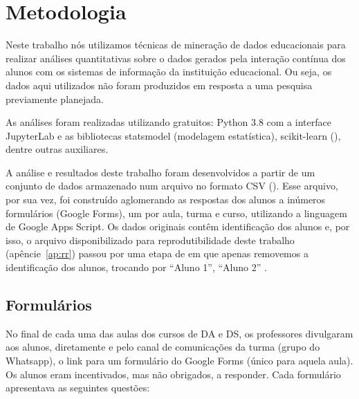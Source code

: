 \section{Metodologia}

Neste trabalho nós utilizamos técnicas de mineração de dados educacionais \cite{Baker2011} para realizar análises quantitativas sobre o dados gerados pela interação contínua dos alunos com os sistemas de informação da instituição educacional.
Ou seja, os dados aqui utilizados não foram produzidos em resposta a uma pesquisa previamente planejada.

As análises foram realizadas utilizando  gratuitos: Python 3.8 com a interface JupyterLab e as bibliotecas statsmodel (modelagem estatística), scikit-learn (), dentre outras auxiliares.

A análise e resultados deste trabalho foram desenvolvidos a partir de um conjunto de dados armazenado num arquivo no formato CSV ().
Esse arquivo, por sua vez, foi construído aglomerando as respostas dos alunos a inúmeros formulários (Google Forms), um por aula, turma e curso, utilizando a linguagem de  Google Apps Script.
Os dados originais contêm identificação dos alunos e, por isso, o arquivo disponibilizado para reprodutibilidade deste trabalho (apêncie~\ref{ap:rr}) passou por uma etapa de em que apenas removemos a identificação dos alunos, trocando por ``Aluno 1'', ``Aluno 2'' \etc.

\subsection{Formulários}

No final de cada uma das aulas dos cursos de DA e DS, os professores divulgaram aos alunos, diretamente e pelo canal de comunicações da turma (grupo do Whatsapp), o link para um formulário do Google Forms (único para aquela aula).
Os alunos eram incentivados, mas não obrigados, a responder.
Cada formulário apresentava as seguintes questões:

